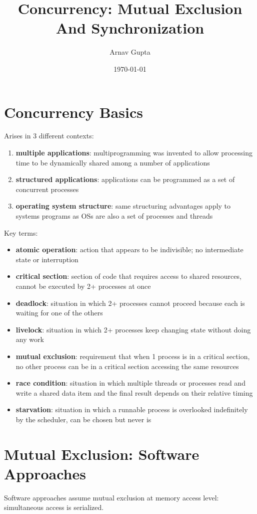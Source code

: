 \documentclass[11pt]{article}
\author{Arnav Gupta}
\date{\today}
\title{Concurrency: Mutual Exclusion And Synchronization}
\begin{document}
\maketitle
\tableofcontents

\section{Concurrency Basics}
\label{sec:org3ffc219}
Arises in 3 different contexts:
\begin{enumerate}
\item \textbf{multiple applications}: multiprogramming was invented to allow
processing time to be dynamically shared among a number of
applications
\item \textbf{structured applications}: applications can be programmed as a
set of concurrent processes
\item \textbf{operating system structure}: same structuring advantages
apply to systems programs as OSs are also a set of processes
and threads
\end{enumerate}

Key terms:
\begin{itemize}
\item \textbf{atomic operation}: action that appears to be indivisible; no
intermediate state or interruption
\item \textbf{critical section}: section of code that requires access to shared
resources, cannot be executed by 2+ processes at once
\item \textbf{deadlock}: situation in which 2+ processes cannot proceed because
each is waiting for one of the others
\item \textbf{livelock}: situation in which 2+ processes keep changing state
without doing any work
\item \textbf{mutual exclusion}: requirement that when 1 process is in a critical
section, no other process can be in a critical section accessing
the same resources
\item \textbf{race condition}: situation in which multiple threads or processes
read and write a shared data item and the final result
depends on their relative timing
\item \textbf{starvation}: situation in which a runnable process is overlooked
indefinitely by the scheduler, can be chosen but never is
\end{itemize}
\section{Mutual Exclusion: Software Approaches}
\label{sec:org08952e0}
Software approaches assume mutual exclusion at memory access level:
simultaneous access is serialized.
\end{document}
